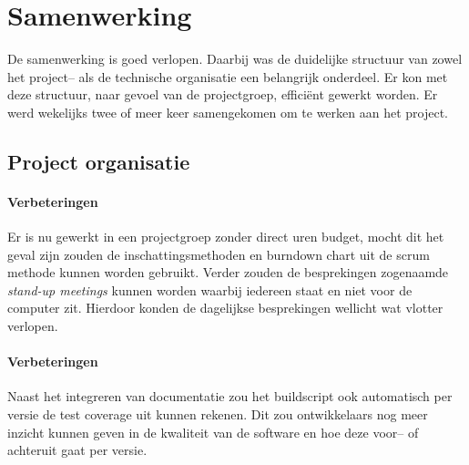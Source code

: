 \section{Samenwerking}
De samenwerking is goed verlopen. Daarbij was de duidelijke structuur van zowel het project– als de technische organisatie een belangrijk onderdeel. Er kon met deze structuur, naar gevoel van de projectgroep, efficiënt gewerkt worden. Er werd wekelijks twee of meer keer samengekomen om te werken aan het project.

\subsection{Project organisatie}

\paragraph{Verbeteringen} Er is nu gewerkt in een projectgroep zonder direct uren budget, mocht dit het geval zijn zouden de inschattingsmethoden en burndown chart uit de scrum methode kunnen worden gebruikt. Verder zouden de besprekingen zogenaamde \emph{stand-up meetings} kunnen worden waarbij iedereen staat en niet voor de computer zit. Hierdoor konden de dagelijkse besprekingen wellicht wat vlotter verlopen.

\paragraph{Verbeteringen} Naast het integreren van documentatie zou het buildscript ook automatisch per versie de test coverage uit kunnen rekenen. Dit zou ontwikkelaars nog meer inzicht kunnen geven in de kwaliteit van de software en hoe deze voor– of achteruit gaat per versie.
